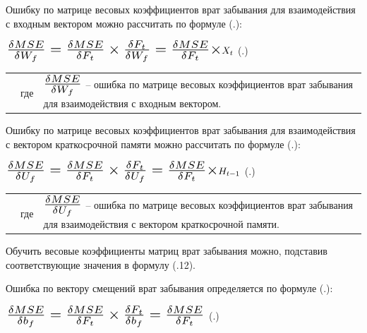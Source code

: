 {  \par \redline Ошибку по матрице весовых коэффициентов врат забывания для взаимодействия с входным вектором можно рассчитать по формуле (\thechaptercntr .\theformulacntr):

  \formulaspace \par \redline 
    $\scaleto{\frac{\delta MSE}{\delta W_f} = \frac{\delta MSE}{\delta F_t} \times \frac{\delta F_t}{\delta W_f} = \frac{\delta MSE}{\delta F_t} \times }{22pt} X_t$
    \hfill (\thechaptercntr .\theformulacntr) \redline
  \formulaspace \addtocounter{formulacntr}{1}

  \begin{tabular}{p{}p{}p{}}
		& где  & $\scaleto{\frac{\delta MSE}{\delta W_f}}{21pt}$ {--} ошибка по матрице весовых коэффициентов врат забывания для взаимодействия с входным вектором. \\
  \end{tabular}

  \par \redline Ошибку по матрице весовых коэффициентов врат забывания для взаимодействия с вектором краткосрочной памяти можно рассчитать по формуле (\thechaptercntr .\theformulacntr):

  \formulaspace \par \redline 
    $\scaleto{\frac{\delta MSE}{\delta U_f} = \frac{\delta MSE}{\delta F_t} \times \frac{\delta F_t}{\delta U_f} = \frac{\delta MSE}{\delta F_t} \times }{22pt} H_{t-1}$
    \hfill (\thechaptercntr .\theformulacntr) \redline
  \formulaspace \addtocounter{formulacntr}{1}

  \begin{tabular}{p{}p{}p{}}
		& где  & $\scaleto{\frac{\delta MSE}{\delta U_f}}{21pt}$ {--} ошибка по матрице весовых коэффициентов врат забывания для взаимодействия с вектором краткосрочной памяти. \\
  \end{tabular}

  \par \redline Обучить весовые коэффициенты матриц врат забывания можно, подставив соответствующие значения в формулу (\thechaptercntr .12).

  \par \redline Ошибка по вектору смещений врат забывания определяется по формуле (\thechaptercntr .\theformulacntr):

  \formulaspace \par \redline 
    $\scaleto{\frac{\delta MSE}{\delta b_f} = \frac{\delta MSE}{\delta F_t} \times \frac{\delta F_t}{\delta b_f} = \frac{\delta MSE}{\delta F_t}}{22pt}$
    \hfill (\thechaptercntr .\theformulacntr) \redline
  \formulaspace \addtocounter{formulacntr}{1}

}
